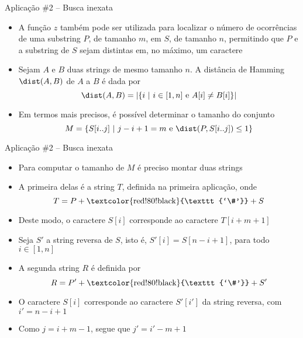 \begin{frame}[fragile]{Aplicação \#2 -- Busca inexata}

    \begin{itemize}
        \item A função $z$ também pode ser utilizada para localizar o número de ocorrências
            de uma substring $P$, de tamanho $m$, em $S$, de tamanho $n$, permitindo que $P$
            e a substring de $S$ sejam distintas em, no máximo, um caractere
        \pause

        \item Sejam $A$ e $B$ duas strings de mesmo tamanho $n$. A distância de Hamming $\dist(A, B)$
            de $A$ a $B$ é dada por
        \[
            \dist(A, B) = | \lbrace i\ | \ i\in [1,n]\ \mbox{e}\ A[i] \neq B[i]\rbrace |
        \]
        \pause
       
        \item Em termos mais precisos, é possível determinar o tamanho do conjunto
        \[
            M = \lbrace S[i..j]\ | \ j - i + 1 = m\ \mbox{e}\ \dist(P, S[i..j])\leq 1\rbrace
        \]
            
    \end{itemize}

\end{frame}

\begin{frame}[fragile]{Aplicação \#2 -- Busca inexata}

    \begin{itemize}
        \item Para computar o tamanho de $M$ é preciso montar duas strings
        \pause

        \item A primeira delas é a string $T$, definida na primeira aplicação, onde
         \[
            T = P + \mbox{\textcolor{red!80!black}{\texttt{`\#'}}} + S
        \]
        \pause

        \item Deste modo, o caractere $S[i]$ corresponde ao caractere $T[i + m + 1]$
        \pause

        \item Seja $S'$ a string reversa de $S$, isto é, $S'[i] = S[n - i + 1]$, para todo
            $i\in [1,n]$
        \pause

        \item A segunda string $R$ é definida por
         \[
            R = P' + \mbox{\textcolor{red!80!black}{\texttt{`\#'}}} + S'
        \]
        \pause

        \item O caractere $S[i]$ corresponde ao caractere $S'[i']$ da string 
            reversa, com $i' = n - i + 1$
        \pause

        \item Como $j = i + m - 1$, segue que $j' = i' - m + 1$ 

    \end{itemize}

\end{frame}

